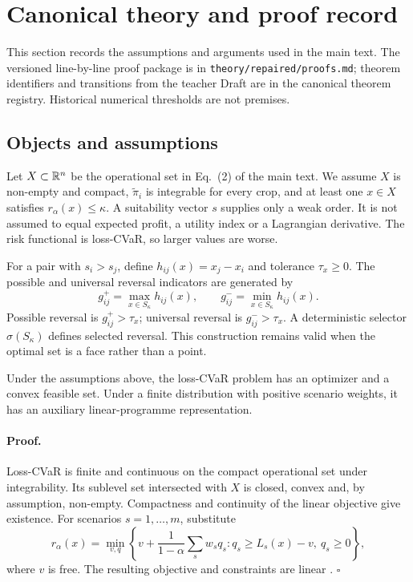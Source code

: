 \section{Canonical theory and proof record}

This section records the assumptions and arguments used in the main text. The versioned line-by-line proof package is in \texttt{theory/repaired/proofs.md}; theorem identifiers and transitions from the teacher Draft are in the canonical theorem registry. Historical numerical thresholds are not premises.

\subsection{Objects and assumptions}
Let $X\subset\mathbb{R}^n$ be the operational set in Eq.~(2) of the main text. We assume $X$ is non-empty and compact, $\widetilde\pi_i$ is integrable for every crop, and at least one $x\in X$ satisfies $r_\alpha(x)\leq\kappa$. A suitability vector $s$ supplies only a weak order. It is not assumed to equal expected profit, a utility index or a Lagrangian derivative. The risk functional is loss-CVaR, so larger values are worse.

For a pair with $s_i>s_j$, define $h_{ij}(x)=x_j-x_i$ and tolerance $\tau_x\geq0$. The possible and universal reversal indicators are generated by
\begin{equation}
g^+_{ij}=\max_{x\in S_\kappa}h_{ij}(x),\qquad
g^-_{ij}=\min_{x\in S_\kappa}h_{ij}(x).
\end{equation}
Possible reversal is $g^+_{ij}>\tau_x$; universal reversal is $g^-_{ij}>\tau_x$. A deterministic selector $\sigma(S_\kappa)$ defines selected reversal. This construction remains valid when the optimal set is a face rather than a point.

\begin{theorem}
Under the assumptions above, the loss-CVaR problem has an optimizer and a convex feasible set. Under a finite distribution with positive scenario weights, it has an auxiliary linear-programme representation.
\end{theorem}
\paragraph{Proof.} Loss-CVaR is finite and continuous on the compact operational set under integrability. Its sublevel set intersected with $X$ is closed, convex and, by assumption, non-empty. Compactness and continuity of the linear objective give existence. For scenarios $s=1,\ldots,m$, substitute
\begin{equation}
r_\alpha(x)=\min_{v,q}\left\{v+\frac{1}{1-\alpha}\sum_s w_sq_s:q_s\geq L_s(x)-v,\ q_s\geq0\right\},
\end{equation}
where $v$ is free. The resulting objective and constraints are linear \citep{rockafellar2000optimization,rockafellar2002conditional}. \hfill$\square$


